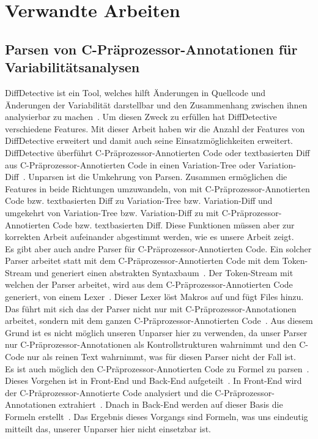 \chapter{Verwandte Arbeiten}

\section{Parsen von C-Präprozessor-Annotationen für Variabilitätsanalysen}
DiffDetective ist ein Tool, welches hilft Änderungen in Quellcode und Änderungen der Variabilität darstellbar und den Zusammenhang zwischen ihnen analysierbar zu machen~\cite{BTS+:ESECFSE22,BSM+:FSE24}. Um diesen Zweck zu erfüllen hat DiffDetective verschiedene Features. Mit dieser Arbeit haben wir die Anzahl der Features von DiffDetective erweitert und damit auch seine Einsatzmöglichkeiten erweitert. DiffDetective  überführt C-Präprozessor-Annotierten Code oder textbasierten Diff aus C-Präprozessor-Annotierten Code in einen Variation-Tree oder Variation-Diff~\cite{BSM+:FSE24}. Unparsen ist die Umkehrung von Parsen. Zusammen ermöglichen die Features in beide Richtungen umzuwandeln, von mit C-Präprozessor-Annotierten Code bzw. textbasierten Diff zu Variation-Tree bzw. Variation-Diff und umgekehrt von Variation-Tree bzw. Variation-Diff zu mit C-Präprozessor-Annotierten Code bzw. textbasierten Diff. Diese Funktionen müssen aber zur korrekten Arbeit aufeinander abgestimmt werden, wie es unsere Arbeit zeigt. \\

Es gibt aber auch andre Parser für C-Präprozessor-Annotierten Code. Ein solcher Parser arbeitet statt mit dem C-Präprozessor-Annotierten Code mit dem Token-Stream und generiert einen abstrakten Syntaxbaum~\cite{GG:PLDI12,KGR+:OOPSLA11}. Der Token-Stream mit welchen der Parser arbeitet, wird aus dem C-Präprozessor-Annotierten Code generiert, von einem Lexer~\cite{GG:PLDI12,KGR+:OOPSLA11}. Dieser Lexer löst Makros auf und fügt Files hinzu. Das führt mit sich das der Parser nicht nur mit C-Präprozessor-Annotationen arbeitet, sondern mit dem ganzen C-Präprozessor-Annotierten Code~\cite{GG:PLDI12,KGR+:OOPSLA11}. Aus diesem Grund ist es nicht möglich unseren Unparser hier zu verwenden, da unser Parser nur C-Präprozessor-Annotationen als Kontrollstrukturen wahrnimmt und den C-Code nur als reinen Text wahrnimmt, was für diesen Parser nicht der Fall ist.\\

Es ist auch möglich den C-Präprozessor-Annotierten Code zu Formel zu parsen~\cite{STLS:GPCE10}. Dieses Vorgehen ist in Front-End und Back-End aufgeteilt~\cite{STLS:GPCE10}. In Front-End wird der C-Präprozessor-Annotierte Code analysiert und die C-Präprozessor-Annotationen extrahiert~\cite{STLS:GPCE10}. Dnach in Back-End werden auf dieser Basis die Formeln erstellt~\cite{STLS:GPCE10}. Das Ergebnis dieses Vorgangs sind Formeln, was uns eindeutig mitteilt das, unserer Unparser hier nicht einsetzbar ist.\\

